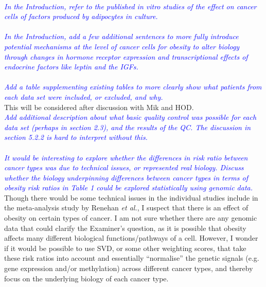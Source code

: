 \documentclass[a4paper, 12pt]{article}
\begin{document}
\noindent
\\

\noindent
\textcolor{blue}{
	\textit{In the Introduction, refer to the published in vitro studies of the effect on cancer cells of factors produced by adipocytes in culture.
	}
}\\

\noindent
\\

\noindent
\textcolor{blue}{
	\textit{In the Introduction, add a few additional sentences to more fully introduce potential mechanisms at the level of cancer cells for obesity to alter biology through changes in hormone receptor expression and transcriptional effects of endocrine factors like leptin and the IGFs.
	}
}\\

\noindent
\\

\noindent
\textcolor{blue}{
	\textit{Add a table supplementing existing tables to more clearly show what patients from each data set were included, or excluded, and why.
	}
}\\

\noindent
This will be considered after discussion with Mik and HOD.
\\

\noindent
\textcolor{blue}{
	\textit{Add additional description about what basic quality control was possible for each data set (perhaps in section 2.3), and the results of the QC.
	The discussion in section 5.2.2 is hard to interpret without this.
	}
}\\

\noindent
\\

\noindent
\textcolor{blue}{
	\textit{It would be interesting to explore whether the differences in risk ratio between cancer types was due to technical issues, or represented real biology.
	Discuss whether the biology underpinning differences between cancer types in terms of obesity risk ratios in Table 1 could be explored statistically using genomic data.
	}
}\\

\noindent
Though there would be some technical issues in the individual studies include in the meta-analysis study by Renehan \textit{et al.}, I suspect that there is an effect of obesity on certain types of cancer.
I am not sure whether there are any genomic data that could clarify the Examiner's question, as it is possible that obesity affects many different biological functions/pathways of a cell.
However, I wonder if it would be possible to use SVD, or some other weighting scores, that take these risk ratios into account and essentially ``normalise'' the genetic signals (e.g. gene expression and/or methylation) across different cancer types, and thereby focus on the underlying biology of each cancer type.
\\
\end{document}
